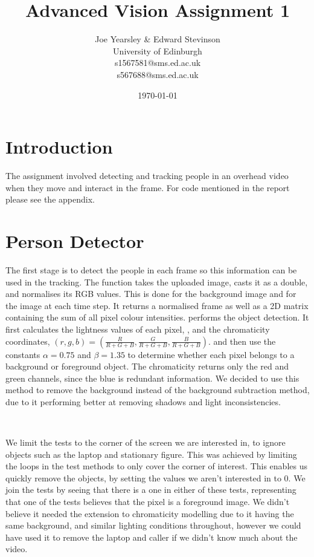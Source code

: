\documentclass{article}
\begin{document}
\begin{titlepage}
\thispagestyle{empty}
\title{Advanced Vision Assignment 1}
\author{Joe Yearsley & Edward Stevinson \\
    University of Edinburgh \\
    s1567581@sms.ed.ac.uk \\
    s567688@sms.ed.ac.uk} 
\date{\today}
\maketitle    

\end{titlepage}

\section{Introduction}


The assignment involved detecting and tracking people in an overhead video when they move and interact in the frame. For code mentioned in the report please see the appendix.



\section{Person Detector}

The first stage is to detect the people in each frame so this information can be used in the tracking. The function  takes the uploaded image, casts it as a double, and normalises its RGB values. This is done for the background image and for the image at each time step. It returns a normalised frame as well as a 2D matrix containing the sum of all pixel colour intensities.  performs the object detection. It first calculates the lightness values of each pixel, , and the chromaticity coordinates, $(r,g,b) = (\frac{R}{R+G+B}, \frac{G}{R+G+B}, \frac{B}{R+G+B})$.   and  then use the constants $\alpha = 0.75$ and $\beta = 1.35$ to determine whether each pixel belongs to a background or foreground object. The chromaticity returns only the red and green channels, since the blue is redundant information. We decided to use this method to remove the background instead of the background subtraction method, due to it performing better at removing shadows and light inconsistencies.

\


We limit the tests to the corner of the screen we are interested in, to ignore objects such as the laptop and stationary figure. This was achieved by limiting the loops in the test methods to only cover the corner of interest. This enables us quickly remove the objects, by setting the values we aren't interested in to $0$.
We join the tests by seeing that there is a one in either of these tests, representing that one of the tests believes that the pixel is a foreground image. We didn't believe it needed the extension to chromaticity modelling due to it having the same background, and similar lighting conditions throughout, however we could have used it to remove the laptop and caller if we didn't know much about the video.
\end{document}
